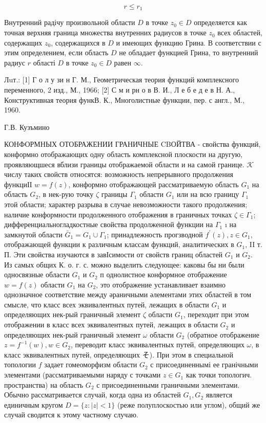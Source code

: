 \documentclass[10pt]{article}
\begin{document}
\[

r \leqslant r_{1}

\]



Внутренний радічу произвольной области $D$ в точке $z_{0} \in D$ определяется как точная верхняя граница множества внутренних радиусов в точке $z_{0}$ всех областей, содержащих $z_{0}$, содержащихся в $D$ и имеющих функцию Грина. В соответствии с этим определением, если область $D$ не обладает функцией Грина, то внутренний радиус $r$ області $D$ в точке $z_{0} \in D$ равен $\infty$.



Лuт.: [1] Г о л у зи н Г. М., Геометрическая теория функций комплексного переменного, 2 изд., М., 1966; [2] С м и рн о в В. И., Л е б е д е в Н. А., Конструктивная теория функВ. К., Многолистные функции, пер. с англ., М., 1960.



Г.В. Кузъмино



КОНФОРМНЫХ ОТОБРАЖЕНИИ ГРАНИЧНЫЕ CBОЙТВА - свойства функций, конформно отображающих одну область комплексной плоскости на другую, проявляющшеся вблизи границы отображаемой области и на самой границе. $\mathcal{K}$ числу таких свойств относятся: возможность непрерывного продолжения функциІІ $w=f(z)$, конформно отображающей рассматриваемую область $G_{1}$ на область $G_{2}$, в нек-рую точку $\zeta$ границы $\Gamma_{1}$ области $G_{1}$ или на всю границу $\Gamma_{1}$ этой области; характер разрыва в случае невозможности такого продолжения; наличие конформности продолженного отображения в граничных точках $\zeta \in \Gamma_{1}$; дифференциальногладкостные свойства продолженной функции на $\Gamma_{1}$ ı на замкнутой области $\bar{G}_{1}=G_{1} \cup \Gamma_{1}$; принадлежность прогзводной $f^{\prime}(z), z \in G_{1}$, отображающей функции к различным классам функций, аналитических в $G_{1}$, II т. П. Эти свойства изучаются в завІсимости от свойств границ областей $G_{1}$ и $G_{2}$. Из самых общих К. о. г. с. можно выделить следующее: каковы бы ни были односвязные области $G_{1}$ и $G_{2}$ п однолистное конформное отображение $w=f(z)$ области $G_{1}$ на $G_{2}$, это отображение устанавливает взаимно однозначное соответствие между әраничными әлементами этих областей в том смысле, что класс всех эквивалентных путей, лежащих в области $G_{1}$ и определяющих нек-рый граничный элемент $\zeta$ области $G_{1}$, переходит при этом отображении в класс всех эквивалентных путей, лежащих в области $G_{2}$ и определяющих нек-рый граничный элемент $\omega$ области $G_{2}$ (обратное отображение $z=f^{-1}(w), w \in G_{2}$, переводит класс эквивалентных путей, определяющих $\omega$, в класс эквивалентных путей, определяющих そ). При этом в специальной топологии $f$ задает гомеоморфизм области $G_{2}$ с присоединеннымі ее гранічными элементами (рассматриваемыми наряду с точками $z \in G_{1}$ как точки топологич. пространства) на область $G_{2}$ с присоединенными граничными элементами. Обычно рассматривается случай, когда одна из областей $G_{1}, G_{2}$ является единичным кругом $D=\{z:|z|<1\}$ (реже полуплоскостью или углом), общий же случай сводится к этому частному случаю.
\end{document}
